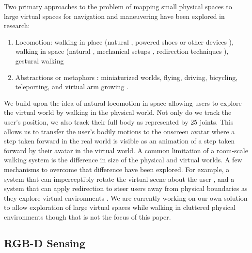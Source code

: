 \documentclass{sigchi}
\begin{document}
Two primary approaches to the problem of mapping small physical spaces to large virtual spaces for navigation and maneuvering have been explored in research: 
\begin{enumerate}
\item Locomotion: walking in place (natural \cite{usoh1999walking}, powered shoes or other devices \cite{iwata2006powered,iwata2007string,iwata2005circulafloor}), walking in space (natural \cite{welch1999hiball}, mechanical setups \cite{hale2014handbook}, redirection techniques \cite{williams2007exploring,steinicke2008taxonomy}), gestural walking \cite{nilsson2013perceived}
\item Abstractions or metaphors \cite{hale2014handbook}: miniaturized worlds, flying, driving, bicycling, teleporting, and virtual arm growing \cite{poupyrev1996go}. 
\end{enumerate}

We build upon the idea of natural locomotion in space allowing users to explore the virtual world by walking in the physical world. Not only do we track the user's position, we also track their full body as represented by 25 joints. This allows us to transfer the user's bodily motions to the onscreen avatar where a step taken forward in the real world is visible as an animation of a step taken forward by their avatar in the virtual world. A common limitation of a room-scale walking system is the difference in size of the physical and virtual worlds. A few mechanisms to overcome that difference have been explored. For example, a system that can imperceptibly rotate the virtual scene about the user \cite{kohli2005combining,razzaque2001redirected}, and a system that can apply redirection to steer users away from physical boundaries as they explore virtual environments \cite{suma2015making}. We are currently working on our own solution to allow exploration of large virtual spaces while walking in cluttered physical environments though that is not the focus of this paper. 

 
\subsection{RGB-D Sensing}
\end{document}
